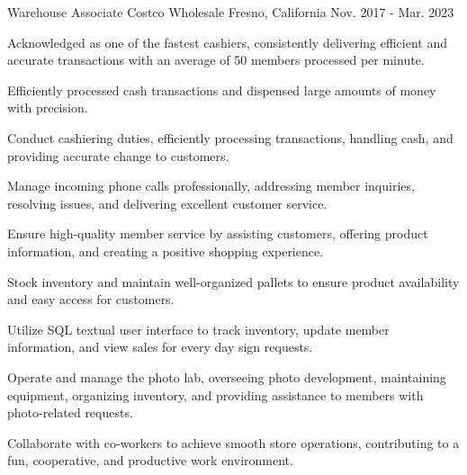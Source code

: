 

\begin{cventries}

  \cventry
    {Warehouse Associate} %
    {Costco Wholesale} %
    {Fresno, California} %
    {Nov. 2017 - Mar. 2023} %
    {
      \begin{cvitems} %
		  \item {Acknowledged as one of the fastest cashiers, consistently delivering efficient and accurate transactions with an average of 50 members processed per minute.}
		  \item {Efficiently processed cash transactions and dispensed large amounts of money with precision.}
		  \item {Conduct cashiering duties, efficiently processing transactions, handling cash, and providing accurate change to customers.}
		  \item {Manage incoming phone calls professionally, addressing member inquiries, resolving issues, and delivering excellent customer service.}
		  \item {Ensure high-quality member service by assisting customers, offering product information, and creating a positive shopping experience.}
		  \item {Stock inventory and maintain well-organized pallets to ensure product availability and easy access for customers.}
		  \item {Utilize SQL textual user interface to track inventory, update member information, and view sales for every day sign requests.}
		  \item {Operate and manage the photo lab, overseeing photo development, maintaining equipment, organizing inventory, and providing assistance to members with photo-related requests.}
		  \item {Collaborate with co-workers to achieve smooth store operations, contributing to a fun, cooperative, and productive work environment.}
      \end{cvitems}
    }

\end{cventries}
